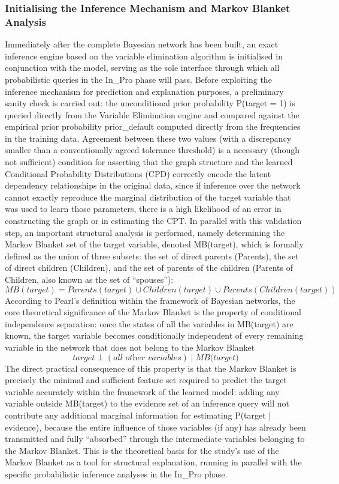 \subsubsection{Initialising the Inference Mechanism and Markov Blanket Analysis}
\noindent
Immediately after the complete Bayesian network has been built, an exact inference engine based on the variable elimination algorithm is initialised in conjunction with the model, serving as the sole interface through which all probabilistic queries in the In\_Pro phase will pass. Before exploiting the inference mechanism for prediction and explanation purposes, a preliminary sanity check is carried out: the unconditional prior probability P(target = 1) is queried directly from the Variable Elimination engine and compared against the empirical prior probability prior\_default computed directly from the frequencies in the training data. Agreement between these two values (with a discrepancy smaller than a conventionally agreed tolerance threshold) is a necessary (though not sufficient) condition for asserting that the graph structure and the learned Conditional Probability Distributions (CPD) correctly encode the latent dependency relationships in the original data, since if inference over the network cannot exactly reproduce the marginal distribution of the target variable that was used to learn those parameters, there is a high likelihood of an error in constructing the graph or in estimating the CPT.
In parallel with this validation step, an important structural analysis is performed, namely determining the Markov Blanket set of the target variable, denoted MB(target), which is formally defined as the union of three subsets: the set of direct parents (Parents), the set of direct children (Children), and the set of parents of the children (Parents of Children, also known as the set of ``spouses''):
$$MB(target) = Parents(target) \cup  Children(target) \cup Parents(Children(target))$$
According to Pearl's definition \cite{pearl2009causality} within the framework of Bayesian networks, the core theoretical significance of the Markov Blanket is the property of conditional independence separation: once the states of all the variables in MB(target) are known, the target variable becomes conditionally independent of every remaining variable in the network that does not belong to the Markov Blanket 
\[
\textit{target} \perp (\textit{all other variables}) \mid \textit{MB(target)}
\]
\vspace{1em}
The direct practical consequence of this property is that the Markov Blanket is precisely the minimal and sufficient feature set required to predict the target variable accurately within the framework of the learned model: adding any variable outside MB(target) to the evidence set of an inference query will not contribute any additional marginal information for estimating P(target | evidence), because the entire influence of those variables (if any) has already been transmitted and fully ``absorbed'' through the intermediate variables belonging to the Markov Blanket. This is the theoretical basis for the study's use of the Markov Blanket as a tool for structural explanation, running in parallel with the specific probabilistic inference analyses in the In\_Pro phase.

